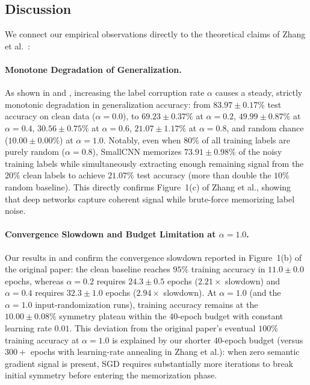 \documentclass[12pt,a4paper]{article}
\theoremstyle{definition}
\theoremstyle{remark}
\begin{document}
\subsection{Discussion}

We connect our empirical observations directly to the theoretical claims of Zhang et al.~\cite{zhang2017understanding}:

\paragraph{Monotone Degradation of Generalization.}
As shown in  and , increasing the label corruption rate $\alpha$ causes a steady, strictly monotonic degradation in generalization accuracy: from $83.97 \pm 0.17\%$ test accuracy on clean data ($\alpha=0.0$), to $69.23 \pm 0.37\%$ at $\alpha=0.2$, $49.99 \pm 0.87\%$ at $\alpha=0.4$, $30.56 \pm 0.75\%$ at $\alpha=0.6$, $21.07 \pm 1.17\%$ at $\alpha=0.8$, and random chance ($10.00 \pm 0.00\%$) at $\alpha=1.0$.
Notably, even when $80\%$ of all training labels are purely random ($\alpha=0.8$), SmallCNN memorizes $73.91 \pm 0.98\%$ of the noisy training labels while simultaneously extracting enough remaining signal from the $20\%$ clean labels to achieve $21.07\%$ test accuracy (more than double the $10\%$ random baseline). This directly confirms Figure~1(c) of Zhang et al., showing that deep networks capture coherent signal while brute-force memorizing label noise.

\paragraph{Convergence Slowdown and Budget Limitation at $\alpha = 1.0$.}
Our results in  and  confirm the convergence slowdown reported in Figure~1(b) of the original paper: the clean baseline reaches $95\%$ training accuracy in $11.0 \pm 0.0$ epochs, whereas $\alpha=0.2$ requires $24.3 \pm 0.5$ epochs ($2.21\times$ slowdown) and $\alpha=0.4$ requires $32.3 \pm 1.0$ epochs ($2.94\times$ slowdown).
At $\alpha = 1.0$ (and the $\alpha = 1.0$ input-randomization runs), training accuracy remains at the $10.00 \pm 0.08\%$ symmetry plateau within the $40$-epoch budget with constant learning rate $0.01$. This deviation from the original paper's eventual $100\%$ training accuracy at $\alpha = 1.0$ is explained by our shorter $40$-epoch budget (versus $300+$ epochs with learning-rate annealing in Zhang et al.): when zero semantic gradient signal is present, SGD requires substantially more iterations to break initial symmetry before entering the memorization phase.
\end{document}
